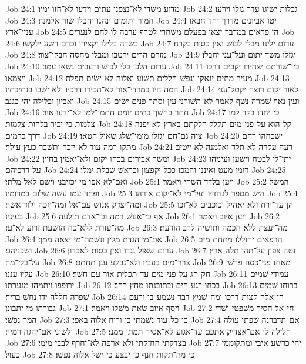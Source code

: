 Job 24:1  מדוע משׁדי לא־נצפנו עתים וידעו לא־חזו ימיו׃
Job 24:2  גבלות ישׂיגו עדר גזלו וירעו׃
Job 24:3  חמור יתומים ינהגו יחבלו שׁור אלמנה׃
Job 24:4  יטו אביונים מדרך יחד חבאו עניי־ארץ׃
Job 24:5  הן פראים במדבר יצאו בפעלם משׁחרי לטרף ערבה לו לחם לנערים׃
Job 24:6  בשׂדה בלילו יקצירו וכרם רשׁע ילקשׁו׃
Job 24:7  ערום ילינו מבלי לבושׁ ואין כסות בקרה׃
Job 24:8  מזרם הרים ירטבו ומבלי מחסה חבקו־צור׃
Job 24:9  יגזלו משׁד יתום ועל־עני יחבלו׃
Job 24:10  ערום הלכו בלי לבושׁ ורעבים נשׂאו עמר׃
Job 24:11  בין־שׁורתם יצהירו יקבים דרכו ויצמאו׃
Job 24:12  מעיר מתים ינאקו ונפשׁ־חללים תשׁוע ואלוה לא־ישׂים תפלה׃
Job 24:13  המה היו במרדי־אור לא־הכירו דרכיו ולא ישׁבו בנתיבתיו׃
Job 24:14  לאור יקום רוצח יקטל־עני ואביון ובלילה יהי כגנב׃
Job 24:15  ועין נאף שׁמרה נשׁף לאמר לא־תשׁורני עין וסתר פנים ישׂים׃
Job 24:16  חתר בחשׁך בתים יומם חתמו־למו לא־ידעו אור׃
Job 24:17  כי יחדו בקר למו צלמות כי־יכיר בלהות צלמות׃
Job 24:18  קל־הוא על־פני־מים תקלל חלקתם בארץ לא־יפנה דרך כרמים׃
Job 24:19  ציה גם־חם יגזלו מימי־שׁלג שׁאול חטאו׃
Job 24:20  ישׁכחהו רחם מתקו רמה עוד לא־יזכר ותשׁבר כעץ עולה׃
Job 24:21  רעה עקרה לא תלד ואלמנה לא ייטיב׃
Job 24:22  ומשׁך אבירים בכחו יקום ולא־יאמין בחיין׃
Job 24:23  יתן־לו לבטח וישׁען ועיניהו על־דרכיהם׃
Job 24:24  רומו מעט ואיננו והמכו ככל יקפצון וכראשׁ שׁבלת ימלו׃
Job 24:25  ואם־לא אפו מי יכזיבני וישׂם לאל מלתי׃
Job 25:1  ויען בלדד השׁחי ויאמר׃
Job 25:2  המשׁל ופחד עמו עשׂה שׁלום במרומיו׃
Job 25:3  הישׁ מספר לגדודיו ועל־מי לא־יקום אורהו׃
Job 25:4  ומה־יצדק אנושׁ עם־אל ומה־יזכה ילוד אשׁה׃
Job 25:5  הן עד־ירח ולא יאהיל וכוכבים לא־זכו בעיניו׃
Job 25:6  אף כי־אנושׁ רמה ובן־אדם תולעה׃
Job 26:1  ויען איוב ויאמר׃
Job 26:2  מה־עזרת ללא־כח הושׁעת זרוע לא־עז׃
Job 26:3  מה־יעצת ללא חכמה ותושׁיה לרב הודעת׃
Job 26:4  את־מי הגדת מלין ונשׁמת־מי יצאה ממך׃
Job 26:5  הרפאים יחוללו מתחת מים ושׁכניהם׃
Job 26:6  ערום שׁאול נגדו ואין כסות לאבדון׃
Job 26:7  נטה צפון על־תהו תלה ארץ על־בלי־מה׃
Job 26:8  צרר־מים בעביו ולא־נבקע ענן תחתם׃
Job 26:9  מאחז פני־כסה פרשׁז עליו עננו׃
Job 26:10  חק־חג על־פני־מים עד־תכלית אור עם־חשׁך׃
Job 26:11  עמודי שׁמים ירופפו ויתמהו מגערתו׃
Job 26:12  בכחו רגע הים ובתובנתו מחץ רהב׃
Job 26:13  ברוחו שׁמים שׁפרה חללה ידו נחשׁ בריח׃
Job 26:14  הן־אלה קצות דרכו ומה־שׁמץ דבר נשׁמע־בו ורעם גבורתו מי יתבונן׃
Job 27:1  ויסף איוב שׂאת משׁלו ויאמר׃
Job 27:2  חי־אל הסיר משׁפטי ושׁדי המר נפשׁי׃
Job 27:3  כי־כל־עוד נשׁמתי בי ורוח אלוה באפי׃
Job 27:4  אם־תדברנה שׂפתי עולה ולשׁוני אם־יהגה רמיה׃
Job 27:5  חלילה לי אם־אצדיק אתכם עד־אגוע לא־אסיר תמתי ממני׃
Job 27:6  בצדקתי החזקתי ולא ארפה לא־יחרף לבבי מימי׃
Job 27:7  יהי כרשׁע איבי ומתקוממי כעול׃
Job 27:8  כי מה־תקות חנף כי יבצע כי ישׁל אלוה נפשׁו׃
